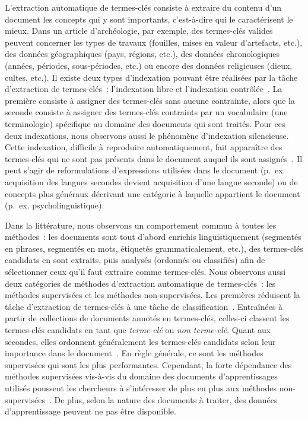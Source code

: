       L'extraction automatique de termes-clés consiste à extraire du contenu
      d'un document les concepts qui y sont importants, c'est-à-dire qui le
      caractérisent le mieux. Dans un article d'archéologie, par exemple, des
      termes-clés valides peuvent concerner les types de travaux (fouilles,
      mises en valeur d'artefacts, etc.), des données géographiques (pays,
      régions, etc.), des données chronologiques (années, périodes,
      sous-périodes, etc.) ou encore des données religieuses (dieux, cultes,
      etc.). Il existe deux types d'indexation pouvant être réalisées par la
      tâche d'extraction de termes-clés~: l'indexation libre et l'indexation
      contrôlée~\citep{paroubek2012deft}. La première consiste à assigner des
      termes-clés sans aucune contrainte, alors que la seconde consiste à
      assigner des termes-clés contraints par un vocabulaire (une terminologie)
      spécifique au domaine des documents qui sont traités. Pour ces deux
      indexations, nous observons aussi le phénomène d'indexation silencieuse.
      Cette indexation, difficile à reproduire automatiquement, fait apparaître
      des termes-clés qui ne sont pas présents dans le document auquel ils sont
      assignés~\citep{liu2011vocabularygap}. Il peut s'agir de reformulations
      d'expressions utilisées dans le document (p.~ex. \og{}acquisition des
      langues secondes\fg{} devient \og{}acquisition d'une langue seconde\fg{})
      ou de concepts plus généraux décrivant une catégorie à laquelle appartient
      le document (p.~ex. \og{}psycholinguistique\fg{}).

      Dans la littérature, nous observons un comportement commun à toutes les
      méthodes~: les documents sont tout d'abord enrichis linguistiquement
      (segmentés en phrases, segmentés en mots, étiquetés grammaticalement,
      etc.), des termes-clés candidats en sont extraits, puis analysés (ordonnés
      ou classifiés) afin de sélectionner ceux qu'il faut extraire comme
      termes-clés. Nous observons aussi deux catégories de méthodes d'extraction
      automatique de termes-clés~: les méthodes supervisées et les méthodes
      non-supervisées. Les premières réduisent la tâche d'extraction de
      termes-clés à une tâche de classification~\citep{witten1999kea}.
      Entraînées à partir de collections de documents annotés en termes-clés,
      celles-ci classent les termes-clés candidats en tant que
      \textit{terme-clé} ou \textit{non terme-clé}. Quant aux secondes, elles
      ordonnent généralement les termes-clés candidats selon leur importance
      dans le document~\citep{wan2008expandrank}. En règle générale, ce sont les
      méthodes supervisées qui sont les plus performantes. Cependant, la forte
      dépendance des méthodes supervisées vis-à-vis du domaine des documents
      d'apprentissages utilisés poussent les chercheurs à s'intéresser de plus
      en plus aux méthodes non-supervisées~\citep{hassan2010conundrums}. De
      plus, selon la nature des documents à traiter, des données d'apprentissage
      peuvent ne pas être disponible.

